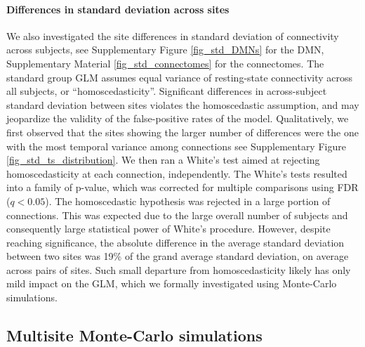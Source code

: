 \documentclass[authoryear]{elsarticle}
\begin{document}
\paragraph{Differences in standard deviation across sites} We also investigated the site differences in standard
deviation of connectivity across subjects, see Supplementary Figure \ref{fig_std_DMNs} for the DMN,
Supplementary Material
\ref{fig_std_connectomes} for the connectomes. The standard group GLM assumes equal variance of resting-state connectivity across all subjects, or ``homoscedasticity''. Significant differences in across-subject standard deviation between sites violates the homoscedastic assumption, and may jeopardize the validity of the false-positive rates of the model. Qualitatively, we first observed that the sites showing the larger number of differences were the one with the most temporal variance among connections see Supplementary Figure \ref{fig_std_ts_distribution}. We then ran a White's test aimed at rejecting homoscedasticity at each connection, independently. The White's tests resulted into a family of p-value, which was corrected for multiple comparisons using FDR ($q<0.05$). The homoscedastic hypothesis was rejected in a large portion of connections. This was expected due to the large overall number of subjects and consequently large statistical power of White's procedure. However, despite reaching significance, the absolute difference in the average standard deviation between two sites was 19\% of the grand average standard deviation, on average across pairs of sites. Such small departure from homoscedasticity likely has only mild impact on the GLM, which we formally investigated using Monte-Carlo simulations. 

\subsection{Multisite Monte-Carlo simulations}
\end{document}
